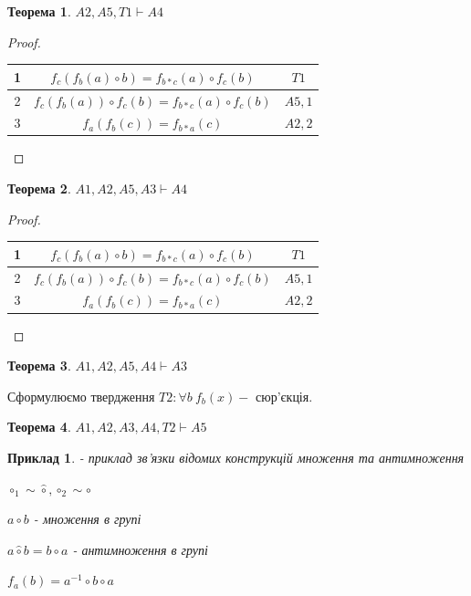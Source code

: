 \documentclass[a4paper,12pt]{article} \usepackage{a4wide}
\numberwithin{equation}{subsection}
\newtheorem{theorem}{Теорема}[subsection]
\newtheorem{example}{Приклад}[subsection]
\begin{document}
\begin{theorem}
  $ A2,A5,T1\vdash A4$

\end{theorem}

\begin{proof}

\begin{tabular}{|c|c|c|}
  \hline
  1 & $f_c(f_b(a)\circ b)=f_{b*c}(a)\circ f_c(b)$& $T1$\\
  \hline

  2 & $f_c(f_b(a))\circ f_c(b)=f_{b*c}(a)\circ f_c(b)$& $A5, 1$\\
  \hline

  3 & $ f_a(f_b(c))=f_{b * a}(c)$ & $A2, 2$\\
  \hline
\end{tabular}

\end{proof}

\begin{theorem}
  $ A1,A2,A5,A3\vdash A4$

\end{theorem}

\begin{proof}

\begin{tabular}{|c|c|c|}
  \hline
  1 & $f_c(f_b(a)\circ b)=f_{b*c}(a)\circ f_c(b)$& $T1$\\
  \hline

  2 & $f_c(f_b(a))\circ f_c(b)=f_{b*c}(a)\circ f_c(b)$& $A5, 1$\\
  \hline

  3 & $ f_a(f_b(c))=f_{b * a}(c)$ & $A2, 2$\\
  \hline
\end{tabular}

\end{proof}

\begin{theorem}
  $ A1,A2,A5,A4\vdash A3$

\end{theorem}

Сформулюємо твердження $T2:\forall b \ f_b(x) -$ сюр'єкція.

\begin{theorem}
  $ A1,A2,A3,A4,T2\vdash A5$

\end{theorem}






  \begin{example}
     - приклад зв'язки відомих
    конструкцій множення та антимноження

    $ \circ_1 \sim \hat{\circ}, \circ_2 \sim \circ $

    $a \circ b$ - множення в групі

    $a \hat{\circ} b= b \circ a$ - антимноження в групі

    $f_a(b)=a^{-1} \circ b \circ a$



  \end{example}
\end{document}
